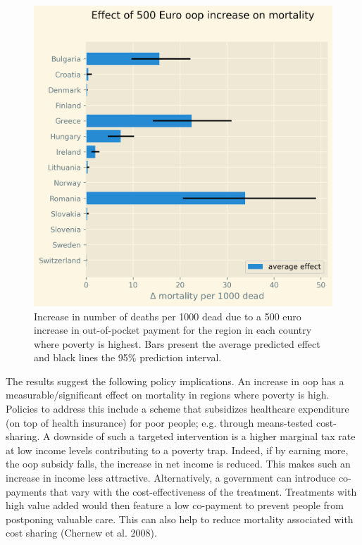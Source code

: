 \documentclass[a4paper,12pt]{article}
\makeatletter
\newcommand{\citeprocitem}[2]{\hyper@linkstart{cite}{citeproc_bib_item_#1}#2\hyper@linkend}
\makeatother
\begin{document}
\begin{figure}[htbp]
\centering
\includegraphics[width=.9\linewidth]{./figures/change_mortality_countries_baseline.png}
\caption{\label{fig:SummaryFigure}Increase in number of deaths per 1000 dead due to a 500 euro increase in out-of-pocket payment for the region in each country where poverty is highest. Bars present the average predicted effect and black lines the 95\% prediction interval.}
\end{figure}


The results suggest the following policy implications. An increase in oop has a measurable/significant effect on mortality in regions where poverty is high. Policies to address this include a scheme that subsidizes healthcare expenditure (on top of health insurance) for poor people; e.g. through means-tested cost-sharing. A downside of such a targeted intervention is a higher marginal tax rate at low income levels contributing to a poverty trap. Indeed, if by earning more, the oop subsidy falls, the increase in net income is reduced. This makes such an increase in income less attractive. Alternatively, a government can introduce co-payments that vary with the cost-effectiveness of the treatment. Treatments with high value added would then feature a low co-payment to prevent people from postponing valuable care. This can also help to reduce mortality associated with cost sharing (\citeprocitem{8}{Chernew et al. 2008}).
\end{document}
